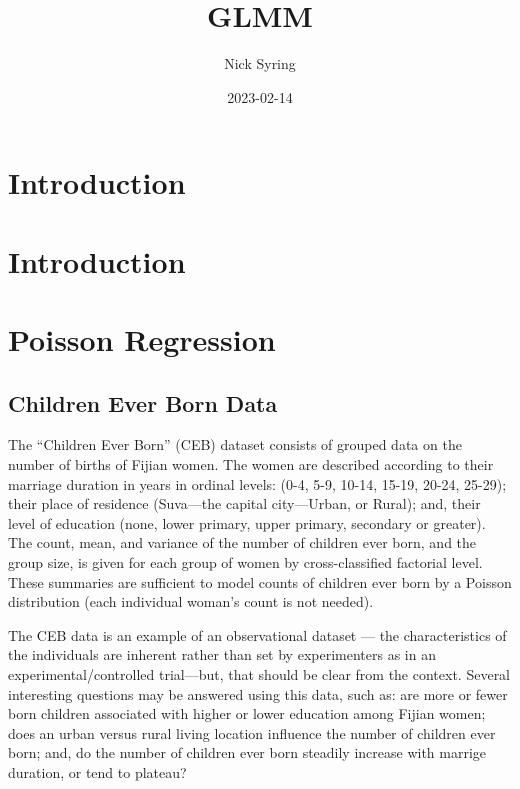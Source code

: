 \documentclass[
]{book}
\title{GLMM}
\author{Nick Syring}
\date{2023-02-14}
\begin{document}
\maketitle

{
\setcounter{tocdepth}{1}
\tableofcontents
}
\hypertarget{introduction}{%
\chapter{Introduction}\label{introduction}}

\hypertarget{intro}{%
\chapter{Introduction}\label{intro}}

\hypertarget{poisson-regression}{%
\chapter{Poisson Regression}\label{poisson-regression}}

\hypertarget{children-ever-born-data}{%
\section{Children Ever Born Data}\label{children-ever-born-data}}

The ``Children Ever Born'' (CEB) dataset consists of grouped data on the number of births of Fijian women. The women are described according to their marriage duration in years in ordinal levels: (0-4, 5-9, 10-14, 15-19, 20-24, 25-29); their place of residence (Suva---the capital city---Urban, or Rural); and, their level of education (none, lower primary, upper primary, secondary or greater). The count, mean, and variance of the number of children ever born, and the group size, is given for each group of women by cross-classified factorial level. These summaries are sufficient to model counts of children ever born by a Poisson distribution (each individual woman's count is not needed).

The CEB data is an example of an observational dataset --- the characteristics of the individuals are inherent rather than set by experimenters as in an experimental/controlled trial---but, that should be clear from the context. Several interesting questions may be answered using this data, such as: are more or fewer born children associated with higher or lower education among Fijian women; does an urban versus rural living location influence the number of children ever born; and, do the number of children ever born steadily increase with marrige duration, or tend to plateau?
\end{document}
